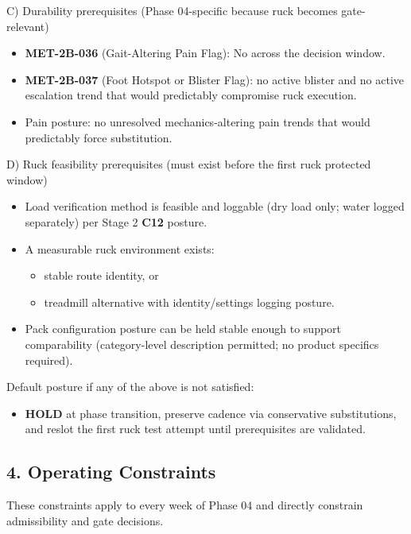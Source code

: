 \documentclass[10pt]{article}
\begin{document}
C) Durability prerequisites (Phase 04-specific because ruck becomes gate-relevant)

\begin{itemize}
\item \textbf{MET-2B-036} (Gait-Altering Pain Flag): No across the decision window.
\item \textbf{MET-2B-037} (Foot Hotspot or Blister Flag): no active blister and no active escalation trend that would predictably compromise ruck execution.
\item Pain posture: no unresolved mechanics-altering pain trends that would predictably force substitution.
\end{itemize}

D) Ruck feasibility prerequisites (must exist before the first ruck protected window)

\begin{itemize}
\item Load verification method is feasible and loggable (dry load only; water logged separately) per Stage 2 \textbf{C12} posture.
\item A measurable ruck environment exists:
  \begin{itemize}
  \item stable route identity, or
  \item treadmill alternative with identity/settings logging posture.
  \end{itemize}
\item Pack configuration posture can be held stable enough to support comparability (category-level description permitted; no product specifics required).
\end{itemize}

Default posture if any of the above is not satisfied:

\begin{itemize}
\item \textbf{HOLD} at phase transition, preserve cadence via conservative substitutions, and reslot the first ruck test attempt until prerequisites are validated.
\end{itemize}

\subsection*{4. Operating Constraints}


These constraints apply to every week of Phase 04 and directly constrain admissibility and gate decisions.
\end{document}
